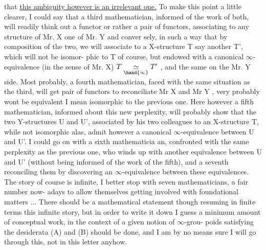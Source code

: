 that \uline{this ambiguity however is an irrelevant one.} To make this point
a little clearer, I could say that a third mathematician, informed of
the work of both, will readily think out a functor or rather a pair of
functors, associating to any structure of Mr. X one of Mr. Y and conver%
\hand{-}sely, in such a way that by composition of the two, we will associate
to a X-structure \hand{(}T say\hand{)} another T', which  will not be isomor-%
phic to T of course, but endowed with a canonical  $\infty$-equivalence
(in the sense of Mr. X) $T \underset{\hand{\infty}}{\simeq} T'$ , and the same on the Mr. Y side. Most
probably, a fourth mathematician, faced with the same situation as the
third, will get   pair of functors to reconciliate Mr X and Mr
Y ,   very probably  wont be equivalent  \hand{(}I mean
isomorphic\hand{)} to the previous one. Here however a fifth mathematician,
informed about this new perplexity, will probably show that the two
Y-structures U and U', associated by his two colleagues to  an
X-structure T, while not isomorphic alas, admit however a canonical
$\infty$-equivalence between U and U'. I could go on with a sixth mathematicia%
an, confronted with the same perplexity as the previous one, who winds
up with another \inserted{$\infty$-}equivalence between U and U' (without being informed of
the work of the fifth), and a seventh reconciling them by discovering
an $\infty$-equivalence between these equivalences. The story of course is
infinite, I better stop with seven mathematicians, a fair number now-%
adays to allow themselves getting involved with foundational matters ...
There should be a mathematical statement though resuming in finite terms
this infinite story, but in order to write it down I guess a minimum
amount of conceptual work, in the context of a given notion of $\infty$-grou-%
poids satisfying the desiderata (A) and (B) should be done, and I am by
no means sure I will go through this, not in this letter anyhow.

